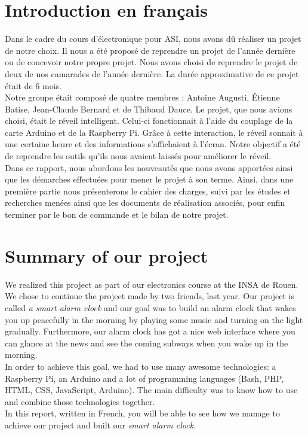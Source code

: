 \section{Introduction en français}
Dans le cadre du cours d'électronique pour ASI, nous avons dû réaliser un projet de notre choix. Il nous a été proposé de reprendre un projet de l'année dernière ou de concevoir notre propre projet. Nous avons choisi de reprendre le projet de deux de nos camarades de l'année dernière. La durée approximative de ce projet était de 6 mois.\\

Notre groupe était composé de quatre membres : Antoine Augusti, Étienne Batise, Jean-Claude Bernard et de Thibaud Dauce. Le projet, que nous avions choisi, était le réveil intelligent. Celui-ci fonctionnait à l'aide du couplage de la carte Arduino et de la Raspberry Pi. Grâce à cette interaction, le réveil sonnait à une certaine heure et  des informations s'affichaient à l'écran. Notre objectif a été de reprendre les outils qu'ils nous avaient laissés pour améliorer le réveil.\\

Dans ce rapport, nous abordons les nouveautés que nous avons apportées ainsi que les démarches effectuées pour mener le projet à son terme. Ainsi, dans une première partie nous présenterons le cahier des charges, suivi par les études et recherches menées ainsi que les documents de réalisation associés, pour enfin terminer par le bon de commande et le bilan de notre projet.

\section{Summary of our project}
We realized this project as part of our electronics course at the INSA de Rouen. We chose to continue the project made by two friends, last year. Our project is called \textit{a smart alarm clock} and our goal was to build an alarm clock that wakes you up peacefully in the morning by playing some music and turning on the light gradually. Furthermore, our alarm clock has got a nice web interface where you can glance at the news and see the coming subways when you wake up in the morning.\\

In order to achieve this goal, we had to use many awesome technologies: a Raspberry Pi, an Arduino and a lot of programming languages (Bash, PHP, HTML, CSS, JavaScript, Arduino). The main difficulty was to know how to use and combine those technologies together.\\

In this report, written in French, you will be able to see how we manage to achieve our project and built our \textit{smart	alarm clock}.
